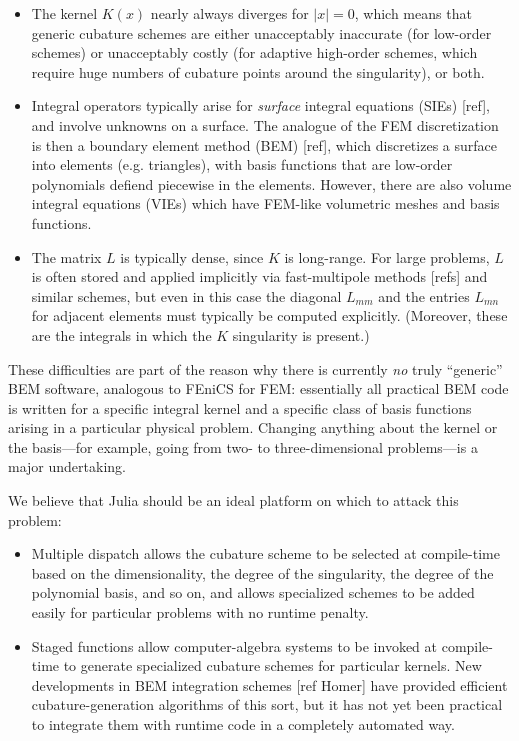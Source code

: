 \begin{itemize}

\item The kernel $K(x)$ nearly always diverges for $|x|=0$, which means that generic cubature schemes are either unacceptably inaccurate (for low-order schemes) or unacceptably costly (for adaptive high-order schemes, which require huge numbers of cubature points around the singularity), or both.

\item Integral operators typically arise for \emph{surface} integral
  equations (SIEs) [ref], and involve unknowns on a surface.  The
  analogue of the FEM discretization is then a boundary element method
  (BEM) [ref], which discretizes a surface into elements
  (e.g. triangles), with basis functions that are low-order
  polynomials defiend piecewise in the elements.  However, there are
  also volume integral equations (VIEs) which have FEM-like volumetric
  meshes and basis functions.

\item The matrix $L$ is typically dense, since $K$ is long-range.  For
  large problems, $L$ is often stored and applied implicitly via
  fast-multipole methods [refs] and similar schemes, but even in this
  case the diagonal $L_{mm}$ and the entries $L_{mn}$ for adjacent
  elements must typically be computed explicitly.  (Moreover, these
  are the integrals in which the $K$ singularity is present.)

\end{itemize}

These difficulties are part of the reason why there is currently \emph{no}
truly ``generic'' BEM software, analogous to FEniCS for FEM: essentially
all practical BEM code is written for a specific integral kernel and
a specific class of basis functions arising in a particular physical problem.
Changing anything about the kernel or the basis---for example, going
from two- to three-dimensional problems---is a major undertaking.

We believe that Julia should be an ideal platform on which to attack this
problem:

\begin{itemize}

\item Multiple dispatch allows the cubature scheme to be selected at compile-time based on the dimensionality, the degree of the singularity, the degree of the polynomial basis, and so on, and allows specialized schemes to be added easily for particular problems with no runtime penalty.

\item Staged functions allow computer-algebra systems to be invoked at
  compile-time to generate specialized cubature schemes for particular
  kernels.  New developments in BEM integration schemes [ref Homer] have
  provided efficient cubature-generation algorithms of this sort, but it
  has not yet been practical to integrate them with runtime code in
  a completely automated way.

\end{itemize}


